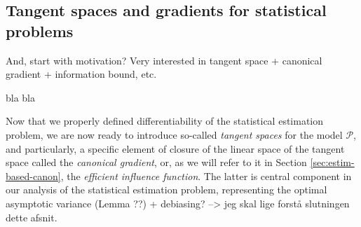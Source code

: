 \documentclass[a4,danish]{article}
\begin{document}

\subsection{Tangent spaces and gradients for statistical problems}
\label{sec:tang-spac-grad}


And, start with motivation? Very interested in tangent space +
canonical gradient + information bound, etc.

bla bla

Now that we properly defined differentiability of the statistical
estimation problem, we are now ready to introduce so-called
\textit{tangent spaces} for the model $\mathcal{P}$, and particularly,
a specific element of closure of the linear space of the tangent space
called the \textit{canonical gradient}, or, as we will refer to it in
Section \ref{sec:estim-based-canon}, the \textit{efficient influence
  function}. The latter is central component in our analysis of the
statistical estimation problem, representing the optimal asymptotic
variance (Lemma ??) + debiasing? --> jeg skal lige forstå slutningen
dette afsnit.
\end{document}
